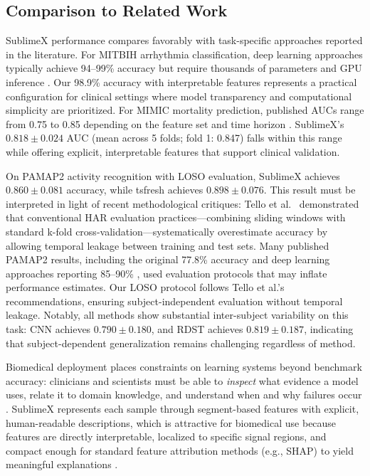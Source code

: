 \documentclass[times, review, 10pt]{elsarticle}
\begin{document}
\subsection{Comparison to Related Work}

SublimeX performance compares favorably with task-specific approaches reported in the literature. For MITBIH arrhythmia classification, deep learning
approaches typically achieve 94--99\% accuracy but require thousands of parameters and GPU inference \cite{acharya2017ecg_deep, hannun2019cardiologist}.
Our 98.9\% accuracy with interpretable features represents a practical configuration for clinical settings where model transparency and computational
simplicity are prioritized. For MIMIC mortality prediction, published AUCs range from 0.75 to 0.85 depending on the feature set and time horizon
\cite{harutyunyan2019multitask, purushotham2018benchmarking}. SublimeX's $0.818 \pm 0.024$ AUC (mean across 5 folds; fold 1: 0.847) falls within this
range while offering explicit, interpretable features that support clinical validation.

On PAMAP2 activity recognition with LOSO evaluation, SublimeX achieves
$0.860 \pm 0.081$ accuracy, while tsfresh achieves $0.898 \pm 0.076$. This
result must be interpreted in light of recent methodological critiques: Tello
et al.\ \cite{tello2025contrasting} demonstrated that conventional HAR
evaluation practices---combining sliding windows with standard k-fold
cross-validation---systematically overestimate accuracy by allowing temporal
leakage between training and test sets. Many published PAMAP2 results,
including the original 77.8\% accuracy \cite{reiss2013confidence} and deep
learning approaches reporting 85--90\% \cite{ordonez2016deep_activity}, used
evaluation protocols that may inflate performance estimates. Our LOSO protocol
follows Tello et al.'s recommendations, ensuring subject-independent evaluation
without temporal leakage. Notably, all methods show substantial inter-subject
variability on this task: CNN achieves $0.790 \pm 0.180$, and RDST achieves
$0.819 \pm 0.187$, indicating that subject-dependent generalization remains challenging regardless of method.

Biomedical deployment places constraints on learning systems beyond benchmark accuracy: clinicians and scientists must be able to \emph{inspect} what evidence
a model uses, relate it to domain knowledge, and understand when and why failures occur \cite{tonekaboni2019clinicians, caruana2015intelligible}.
SublimeX represents each sample through segment-based features with explicit, human-readable
descriptions, which is attractive for biomedical use because features are directly interpretable, localized to specific signal regions, and compact enough for
standard feature attribution methods (e.g., SHAP) to yield meaningful explanations \cite{fulcher2018feature}.
\end{document}
